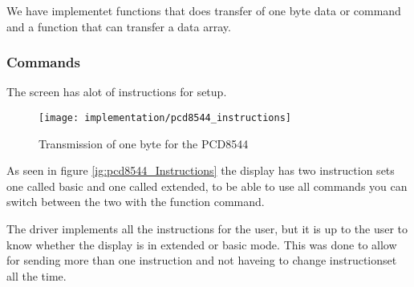 We have implementet functions that does transfer of one byte data or command and a function that can transfer a data array.


\subsubsection{Commands}
The screen has alot of instructions for setup.

\begin{figure}
	\centering
	\texttt{[image: implementation/pcd8544\_instructions]}
	\caption{Transmission of one byte for the PCD8544\cite[p. 12]{philips:pcd8544}}
	\label{fig:pcd8544_Instructions}
\end{figure}

As seen in figure \ref{ig:pcd8544_Instructions} the display has two instruction sets
one called basic and one called extended, to be able to use all commands you can switch between the two with the function command.

The driver implements all the instructions for the user, but it is up to the user to know whether the display is in extended or basic mode.
This was done to allow for sending more than one instruction and not haveing to change instructionset all the time.
